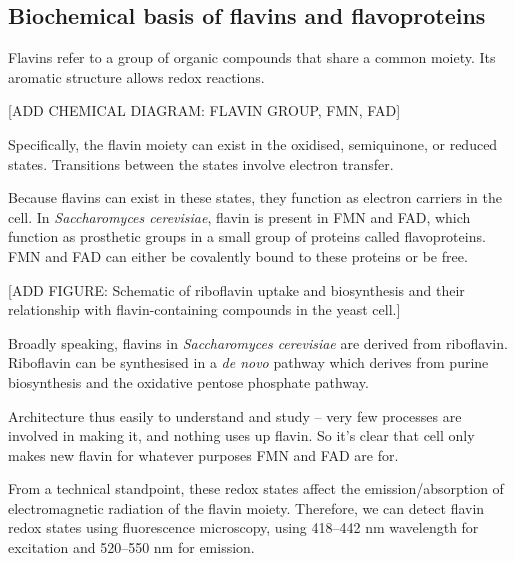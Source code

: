\subsection{Biochemical basis of flavins and flavoproteins}
\label{subsec:intro-flavin-biochem}

Flavins refer to a group of organic compounds that share a common moiety.
Its aromatic structure allows redox reactions.

[ADD CHEMICAL DIAGRAM: FLAVIN GROUP, FMN, FAD]

Specifically, the flavin moiety can exist in the oxidised, semiquinone, or reduced states.
Transitions between the states involve electron transfer.

Because flavins can exist in these states, they function as electron carriers in the cell.
In \emph{Saccharomyces cerevisiae}, flavin is present in FMN and FAD, which function as prosthetic groups in a small group of proteins called flavoproteins.
FMN and FAD can either be covalently bound to these proteins or be free.

[ADD FIGURE: Schematic of riboflavin uptake and biosynthesis and their relationship with flavin-containing compounds in the yeast cell.]

Broadly speaking, flavins in \emph{Saccharomyces cerevisiae} are derived from riboflavin.
Riboflavin can be synthesised in a \emph{de novo} pathway which derives from purine biosynthesis and the oxidative pentose phosphate pathway.

Architecture thus easily to understand and study -- very few processes are involved in making it, and nothing uses up flavin.
So it's clear that cell only makes new flavin for whatever purposes FMN and FAD are for.

From a technical standpoint, these redox states affect the emission/absorption of electromagnetic radiation of the flavin moiety.
Therefore, we can detect flavin redox states using fluorescence microscopy, using 418--442 nm wavelength for excitation and 520--550 nm for emission.

